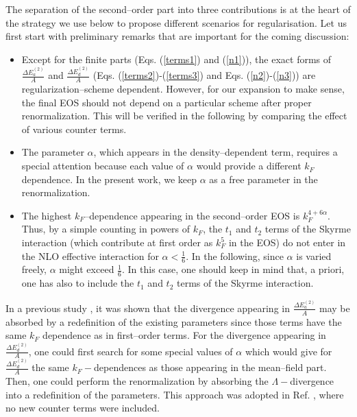 \documentclass[aps,11pt,prc,preprint,superscriptaddress,nofootinbib]{revtex4}
\begin{document}
The separation of the second--order part into three contributions is at the heart of the strategy 
we use below to propose different scenarios for regularisation. Let us first start with preliminary remarks that are important for 
the coming discussion:
\begin{itemize}
  \item Except for the finite parts (Eqs. (\ref{terms1}) and (\ref{n1})), the exact forms of $\frac{\Delta E_{a}^{(2)}}{A}$ and $%
\frac{\Delta E_{d}^{(2)}}{A}$ (Eqs. (\ref{terms2})-(\ref{terms3}) and Eqs. (\ref{n2})-(\ref{n3})) are regularization--scheme dependent. However, for our expansion to make sense, the final EOS should not depend on a particular scheme after proper renormalization. This will be verified in the following by comparing the effect of various counter terms.   
  \item The parameter $\alpha $, which appears in the density--dependent term, requires
a special attention because each value of $\alpha$ would provide a different $k_F$ dependence. 
In the present work, we keep $\alpha $ as a free parameter in
the renormalization.
  \item The highest $k_F$--dependence appearing in the second--order
EOS is $k_F^{4+6\alpha }$. Thus, by a simple counting in powers of $k_F$,
the $t_{1}$ and $t_{2}$ terms of the Skyrme interaction (which contribute at first order as $k_F^{5}$ in the 
EOS) do not enter in the NLO effective interaction for $\alpha <\frac{1}{6}$.  In the following, since $\alpha$ is varied freely, $\alpha$ might 
exceed $\frac{1}{6}$. In this case, one should keep in mind that, a priori, one has also to include the $t_1$ and $t_2$ terms of the Skyrme 
interaction.
\end{itemize}
In a previous study \cite{bira}, it was shown that the divergence appearing in  $\frac{\Delta E_{a}^{(2)}}%
{A}$ may be absorbed by a redefinition of the existing parameters since those terms have the same 
$k_F$ dependence as in first--order terms. For the divergence appearing in 
$\frac{\Delta E_{d}^{(2)}}{A}$, one could first
search for some special values of $\alpha $ which would give for $\frac{\Delta
E_{d}^{(2)}}{A}$ the same $k_F-$dependences as those
appearing in the mean--field part. Then, one could perform the renormalization by absorbing
the $\Lambda -$divergence into a redefinition of the parameters. This approach
was adopted in Ref. \cite{bira}, where no new counter terms were included. 
\end{document}
